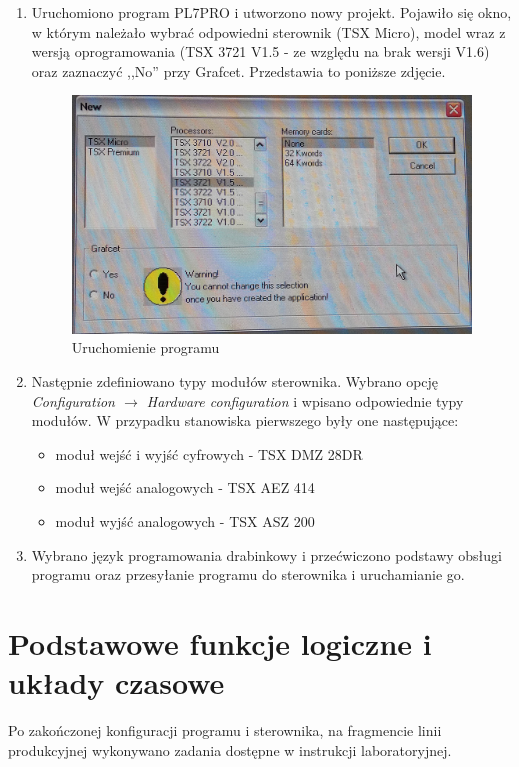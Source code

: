 \documentclass[12pt]{article}
\begin{document}
\begin{enumerate}
    \item Uruchomiono program PL7PRO i utworzono nowy projekt. Pojawiło się okno, w którym należało wybrać odpowiedni sterownik (TSX Micro), model wraz z wersją oprogramowania (TSX 3721 V1.5 - ze względu na brak wersji V1.6) oraz zaznaczyć ,,No'' przy Grafcet. Przedstawia to poniższe zdjęcie.
    \begin{figure}[H]
        \centering
        \includegraphics[scale=0.20]{konfiguracja.jpg}
        \caption{Uruchomienie programu}
    \end{figure}


    \item Następnie zdefiniowano typy modułów sterownika. Wybrano opcję \textit{Configuration $ \rightarrow $ Hardware configuration} i wpisano odpowiednie typy modułów. W przypadku stanowiska pierwszego były one następujące: 
    \begin{itemize}
        \item moduł wejść i wyjść cyfrowych - TSX DMZ 28DR
        \item moduł wejść analogowych - TSX AEZ 414
        \item moduł wyjść analogowych - TSX ASZ 200
    \end{itemize}
    \item Wybrano język programowania drabinkowy i przećwiczono podstawy obsługi programu oraz przesyłanie programu do sterownika i uruchamianie go.
\end{enumerate}

\section{Podstawowe funkcje logiczne i układy czasowe}
Po zakończonej konfiguracji programu i sterownika, na fragmencie linii produkcyjnej wykonywano zadania dostępne w instrukcji laboratoryjnej.
\end{document}
